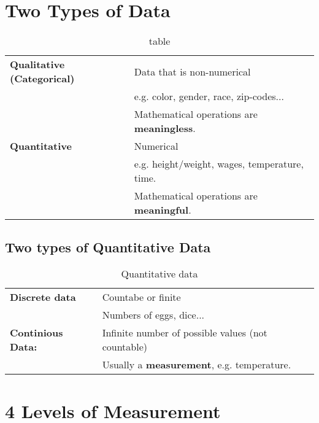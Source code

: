 \documentclass{book}
\begin{document}
\section{Two Types of Data}

\begin{table}[htbp]
  \centering
  \begin{tabular}{>{\bfseries}l l}
      \toprule
      Qualitative (Categorical) & Data that is non-numerical \\
                                & e.g. color, gender, race, zip-codes...\\
                                & Mathematical operations are \textbf{meaningless}.\\
      \midrule
      Quantitative & Numerical \\
                   & e.g. height/weight, wages, temperature, time.  \\
                   & Mathematical operations are \textbf{meaningful}.  \\
      \bottomrule
  \end{tabular}
  \caption{table}
  \label{tab:vocab-3}
\end{table}

\clearpage


\subsection{Two types of Quantitative Data}

\begin{table}[htbp]
  \centering
  \begin{tabular}{>{\bfseries}l l}
      \toprule
      Discrete data & Countabe or finite \\
                    & Numbers of eggs, dice... \\
      \midrule
      Continious Data: & Infinite number of possible values (not countable) \\
                       & Usually a \textbf{measurement}, e.g. temperature. \\
      \bottomrule
  \end{tabular}
  \caption{Quantitative data}
  \label{tab:vocab-4}
\end{table}

\section{4 Levels of Measurement}
\end{document}
